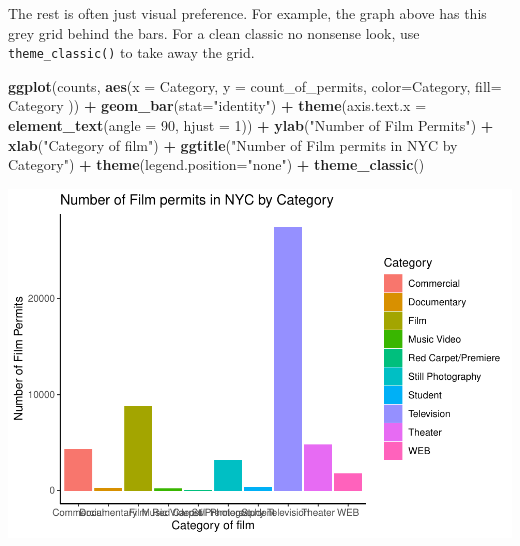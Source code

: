 \documentclass[
]{book}
\newenvironment{Shaded}{\begin{snugshade}}{\end{snugshade}}
\newcommand{\AttributeTok}[1]{\textcolor[rgb]{0.13,0.29,0.53}{#1}}
\newcommand{\DecValTok}[1]{\textcolor[rgb]{0.00,0.00,0.81}{#1}}
\newcommand{\FunctionTok}[1]{\textcolor[rgb]{0.13,0.29,0.53}{\textbf{#1}}}
\newcommand{\NormalTok}[1]{#1}
\newcommand{\SpecialCharTok}[1]{\textcolor[rgb]{0.81,0.36,0.00}{\textbf{#1}}}
\newcommand{\StringTok}[1]{\textcolor[rgb]{0.31,0.60,0.02}{#1}}
\begin{document}
The rest is often just visual preference. For example, the graph above has this grey grid behind the bars. For a clean classic no nonsense look, use \texttt{theme\_classic()} to take away the grid.

\begin{Shaded}
\begin{Highlighting}[]
\FunctionTok{ggplot}\NormalTok{(counts, }\FunctionTok{aes}\NormalTok{(}\AttributeTok{x =}\NormalTok{ Category, }\AttributeTok{y =}\NormalTok{ count\_of\_permits, }
                   \AttributeTok{color=}\NormalTok{Category, }
                   \AttributeTok{fill=}\NormalTok{ Category )) }\SpecialCharTok{+}
  \FunctionTok{geom\_bar}\NormalTok{(}\AttributeTok{stat=}\StringTok{"identity"}\NormalTok{) }\SpecialCharTok{+} 
  \FunctionTok{theme}\NormalTok{(}\AttributeTok{axis.text.x =} \FunctionTok{element\_text}\NormalTok{(}\AttributeTok{angle =} \DecValTok{90}\NormalTok{, }\AttributeTok{hjust =} \DecValTok{1}\NormalTok{)) }\SpecialCharTok{+}
  \FunctionTok{ylab}\NormalTok{(}\StringTok{"Number of Film Permits"}\NormalTok{) }\SpecialCharTok{+} 
  \FunctionTok{xlab}\NormalTok{(}\StringTok{"Category of film"}\NormalTok{) }\SpecialCharTok{+}
  \FunctionTok{ggtitle}\NormalTok{(}\StringTok{"Number of Film permits in NYC by Category"}\NormalTok{) }\SpecialCharTok{+}
  \FunctionTok{theme}\NormalTok{(}\AttributeTok{legend.position=}\StringTok{"none"}\NormalTok{) }\SpecialCharTok{+}
  \FunctionTok{theme\_classic}\NormalTok{()}
\end{Highlighting}
\end{Shaded}

\includegraphics{Statistics_Lab_files/figure-latex/1categoryI-1.pdf}
\end{document}
